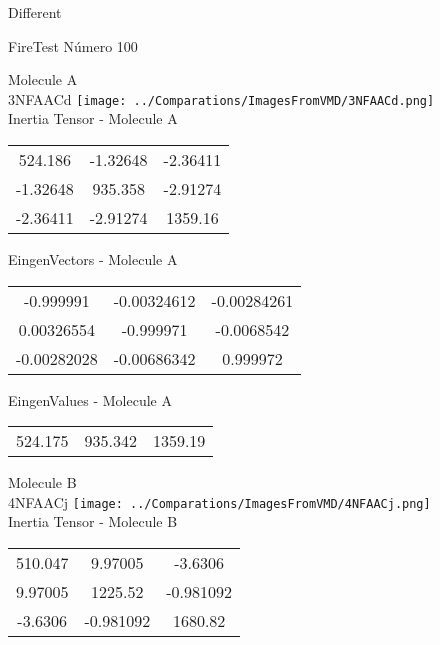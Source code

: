 \begin{center}
\vtab
\vtab
\textcolor{NavyBlue}{\Large Different}
\end{center}

 \newpage

\vtab[-2cm]
\begin{center}
{\large FireTest \tab Número 100}
\end{center}
\begin{multicols}{2}
\begin{center}

Molecule A \\ 
3NFAACd
\texttt{[image: ../Comparations/ImagesFromVMD/3NFAACd.png]}
\\
Inertia Tensor - Molecule A \\
\vtab

\begin{tabular}{|c c c|}
524.186	 & 	-1.32648	 & 	-2.36411	 \\
-1.32648	 & 	935.358	 & 	-2.91274	 \\
-2.36411	 & 	-2.91274	 & 	1359.16
\end{tabular}

\vtab
 EingenVectors - Molecule A     \\
\vtab
\begin{tabular}{|c c c|}
-0.999991	 & 	-0.00324612	 & 	-0.00284261	 \\
0.00326554	 & 	-0.999971	 & 	-0.0068542	 \\
-0.00282028	 & 	-0.00686342	 & 	0.999972
\end{tabular}

\vtab
 EingenValues - Molecule A     \\
\vtab
\begin{tabular}{|c c c|}
524.175	 & 	935.342	 & 	1359.19	 \\
\end{tabular}
\columnbreak

Molecule B \\ 
4NFAACj
\texttt{[image: ../Comparations/ImagesFromVMD/4NFAACj.png]}
\\
Inertia Tensor - Molecule B \\
\vtab

\begin{tabular}{|c c c|}
510.047	 & 	9.97005	 & 	-3.6306	 \\
9.97005	 & 	1225.52	 & 	-0.981092	 \\
-3.6306	 & 	-0.981092	 & 	1680.82
\end{tabular}


\end{center}
\end{multicols}
